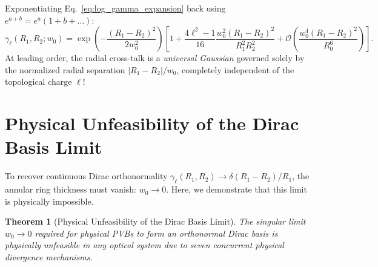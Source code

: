 \documentclass[11pt,a4paper]{article}
\newtheorem{theorem}{Theorem}
\begin{document}
Exponentiating Eq.~\eqref{eq:log_gamma_expansion} back using $e^{a + b} = e^a (1 + b + \dots)$:
\begin{equation}
\boxed{\gamma_\ell(R_1, R_2; w_0) = \exp\left( - \frac{(R_1 - R_2)^2}{2 w_0^2} \right) \left[ 1 + \frac{4\ell^2 - 1}{16} \frac{w_0^2 (R_1 - R_2)^2}{R_1^2 R_2^2} + \mathcal{O}\left( \frac{w_0^4 (R_1 - R_2)^2}{R_0^6} \right) \right].}
\label{eq:asymptotic_overlap}
\end{equation}
At leading order, the radial cross-talk is a \emph{universal Gaussian} governed solely by the normalized radial separation $|R_1 - R_2| / w_0$, completely independent of the topological charge $\ell$!

\section{Physical Unfeasibility of the Dirac Basis Limit}
\label{sec:unfeasibility}

To recover continuous Dirac orthonormality $\gamma_\ell(R_1, R_2) \to \delta(R_1 - R_2) / R_1$, the annular ring thickness must vanish: $w_0 \to 0$. Here, we demonstrate that this limit is physically impossible.

\begin{theorem}[Physical Unfeasibility of the Dirac Basis Limit]
\label{thm:unfeasibility}
The singular limit $w_0 \to 0$ required for physical PVBs to form an orthonormal Dirac basis is physically unfeasible in any optical system due to seven concurrent physical divergence mechanisms.
\end{theorem}
\end{document}
